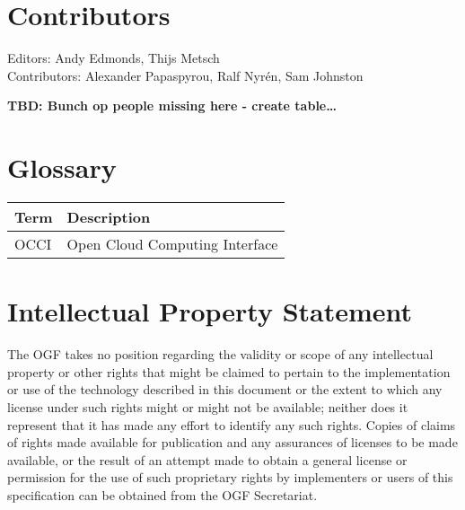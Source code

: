 \documentclass[10pt,a4paper]{article}
\begin{document}

%
%
%
%
%
%

\section{Contributors}

Editors: Andy Edmonds, Thijs Metsch \\
Contributors: Alexander Papaspyrou, Ralf Nyrén, Sam Johnston

\textbf{TBD: Bunch op people missing here - create table\ldots}

\section{Glossary}

\begin{tabular}{l|l}
Term & Description \\
\hline
OCCI & Open Cloud Computing Interface
\end{tabular}

\section{Intellectual Property Statement}

The OGF takes no position regarding the validity or scope of any intellectual property or other rights that might be claimed to pertain to the implementation or use of the technology described in this document or the extent to which any license under such rights might or might not be available; neither does it represent that it has made any effort to identify any such rights. Copies of claims of rights made available for publication and any assurances of licenses to be made available, or the result of an attempt made to obtain a general license or permission for the use of such proprietary rights by implementers or users of this specification can be obtained from the OGF Secretariat.
\end{document}

